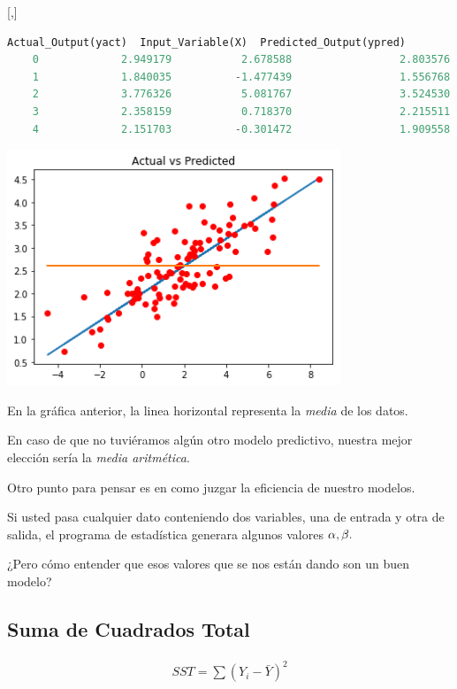 [,]{} 
\begin{lstlisting}[language=Python]
	Actual_Output(yact)  Input_Variable(X)  Predicted_Output(ypred)
	0             2.949179           2.678588                 2.803576
	1             1.840035          -1.477439                 1.556768
	2             3.776326           5.081767                 3.524530
	3             2.358159           0.718370                 2.215511
	4             2.151703          -0.301472                 1.909558
\end{lstlisting}


\begin{center}
	\includegraphics[width=10cm,keepaspectratio=true]{./images/actualVsPredicted.png}
\end{center}



En la gráfica anterior, la linea horizontal representa la \emph{media} de los datos.


En caso de que no tuviéramos algún otro modelo predictivo, nuestra mejor elección sería la \emph{media aritmética}.


Otro punto para pensar es en como juzgar la eficiencia de nuestro modelos. 

Si usted pasa cualquier dato conteniendo dos variables, una de entrada y otra de salida, el programa de estadística generara algunos valores $\alpha,\beta.$



¿Pero cómo entender que esos valores que se nos están dando son un buen modelo?

\subsection{Suma de Cuadrados Total}
\begin{align}
	SST = \sum\left( Y_{i}-\bar{Y} \right)^{2}
\end{align}

